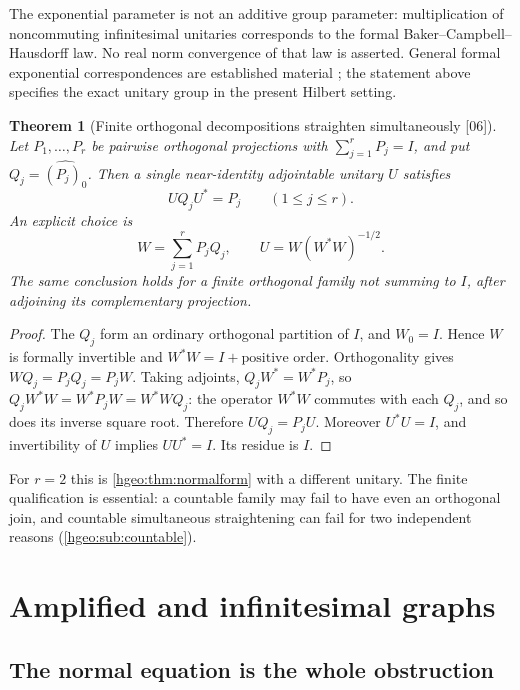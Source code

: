 \documentclass[11pt,letterpaper]{article}
\numberwithin{equation}{section}
\newtheorem{theorem}{Theorem}[section]
\theoremstyle{definition}
\theoremstyle{remark}
\newcommand{\src}[1]{\textup{\textsf{\small[#1]}}}
\begin{document}
The exponential parameter is not an additive group parameter:
multiplication of noncommuting infinitesimal unitaries corresponds to the
formal Baker--Campbell--Hausdorff law. No real norm convergence of that law
is asserted. General formal exponential correspondences are established
material \cite{Bagayoko}; the statement above specifies the exact unitary
group in the present Hilbert setting.

\begin{theorem}[Finite orthogonal decompositions straighten simultaneously
\src{06}]\label{hgeo:thm:finite}
Let $P_1,\ldots,P_r$ be pairwise orthogonal projections with
$\sum_{j=1}^rP_j=I$, and put $Q_j=\widehat{(P_j)_0}$. Then a single
near-identity adjointable unitary $U$ satisfies
\[
 UQ_jU^*=P_j\qquad(1\le j\le r).
\]
An explicit choice is
\[
 W=\sum_{j=1}^rP_jQ_j,\qquad U=W(W^*W)^{-1/2}.
\]
The same conclusion holds for a finite orthogonal family not summing to
$I$, after adjoining its complementary projection.
\end{theorem}
\begin{proof}
The $Q_j$ form an ordinary orthogonal partition of $I$, and $W_0=I$.
Hence $W$ is formally invertible and $W^*W=I+\text{positive order}$.
Orthogonality gives $WQ_j=P_jQ_j=P_jW$. Taking adjoints,
$Q_jW^*=W^*P_j$, so $Q_jW^*W=W^*P_jW=W^*WQ_j$: the operator $W^*W$ commutes
with each $Q_j$, and so does its inverse square root. Therefore
$UQ_j=P_jU$. Moreover $U^*U=I$, and invertibility of $U$ implies $UU^*=I$.
Its residue is $I$.
\end{proof}

For $r=2$ this is \cref{hgeo:thm:normalform} with a different unitary. The
finite qualification is essential: a countable family may fail to have even
an orthogonal join, and countable simultaneous straightening can fail for two
independent reasons (\cref{hgeo:sub:countable}).

\section{Amplified and infinitesimal graphs}
\label{hgeo:sec:graphs}

\subsection{The normal equation is the whole obstruction}
\end{document}
